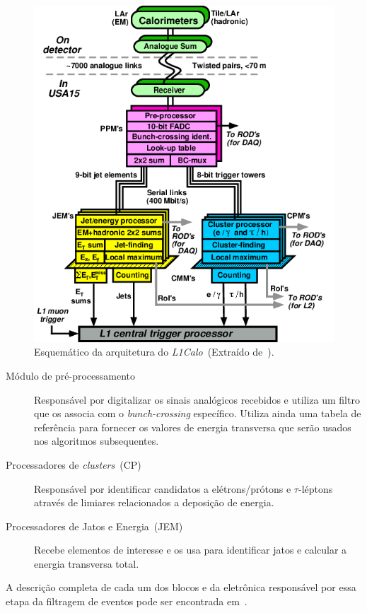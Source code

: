 \begin{figure}[htpb!]
    \centering
    \includegraphics[width=12cm]{images/CaloTrigArch.png}
    \caption[Esquemático do funcionamento do \emph{L1Calo}.]{Esquemático da
    arquitetura do \emph{L1Calo}~(Extraído de~\cite{ATLAS2008}).}
    \label{fig:L1CALO}
\end{figure}


\begin{description}
    \item[Módulo de pré-processamento] Responsável por digitalizar os sinais
    analógicos recebidos e utiliza um filtro que os associa com o
    \emph{bunch-crossing} específico. Utiliza  ainda uma tabela de
    referência para fornecer os valores de energia transversa que serão usados
    nos algoritmos subsequentes.
    \item[Processadores de \emph{clusters}~(CP)] Responsável por identificar
    candidatos a elétrons/prótons e $\tau$-léptons através de limiares
    relacionados a deposição de energia.
    \item[Processadores de Jatos e Energia~(JEM)] Recebe elementos de interesse
    e os usa para identificar jatos e calcular a energia transversa total.
\end{description}

 A descrição completa de cada um dos blocos e da eletrônica responsável por essa
 etapa da filtragem de eventos pode ser encontrada em~\cite{ACHENBACH2008}.




